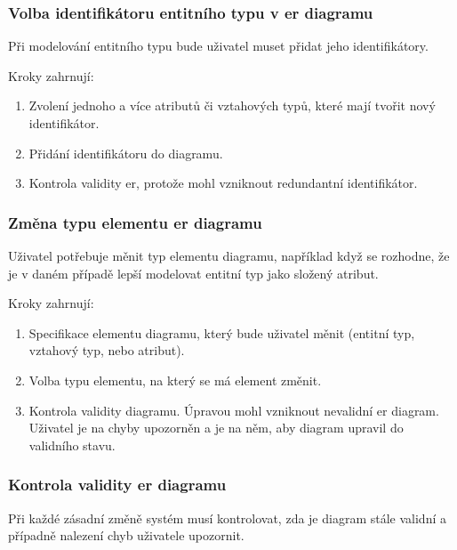 \subsubsection*{Volba identifikátoru entitního typu v \acrshort{er} diagramu}

Při modelování entitního typu bude uživatel muset přidat jeho identifikátory.

\noindent Kroky zahrnují:
\begin{enumerate}
  \item Zvolení jednoho a více atributů či vztahových typů, které mají tvořit nový identifikátor.
  \item Přidání identifikátoru do diagramu.
  \item Kontrola validity \acrshort{er}, protože mohl vzniknout redundantní identifikátor.
\end{enumerate}

\subsubsection*{Změna typu elementu \acrshort{er} diagramu}

Uživatel potřebuje měnit typ elementu diagramu, například když se rozhodne, že je v daném případě lepší modelovat entitní typ jako složený atribut.

\noindent Kroky zahrnují:
\begin{enumerate}
  \item Specifikace elementu diagramu, který bude uživatel měnit (entitní typ, vztahový typ, nebo atribut).
  \item Volba typu elementu, na který se má element změnit.
  \item Kontrola validity diagramu.
        Úpravou mohl vzniknout nevalidní \acrshort{er} diagram.
        Uživatel je na chyby upozorněn a je na něm, aby diagram upravil do validního stavu.
\end{enumerate}

\subsubsection*{Kontrola validity \acrshort{er} diagramu}
Při každé zásadní změně systém musí kontrolovat, zda je diagram stále validní a případně nalezení chyb uživatele upozornit.

